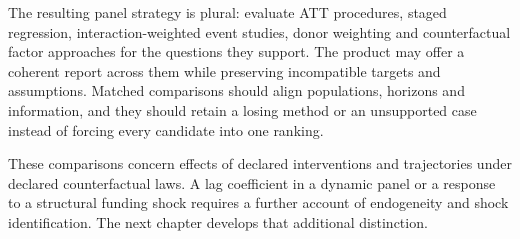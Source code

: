 The resulting panel strategy is plural: evaluate ATT procedures, staged
regression, interaction-weighted event studies, donor weighting and
counterfactual factor approaches for the questions they support. The product
may offer a coherent report across them while preserving incompatible targets
and assumptions. Matched comparisons should align populations, horizons and
information, and they should retain a losing method or an unsupported case
instead of forcing every candidate into one ranking.

These comparisons concern effects of declared interventions and trajectories
under declared counterfactual laws. A lag coefficient in a dynamic panel or
a response to a structural funding shock requires a further account of
endogeneity and shock identification. The next chapter develops that
additional distinction.

